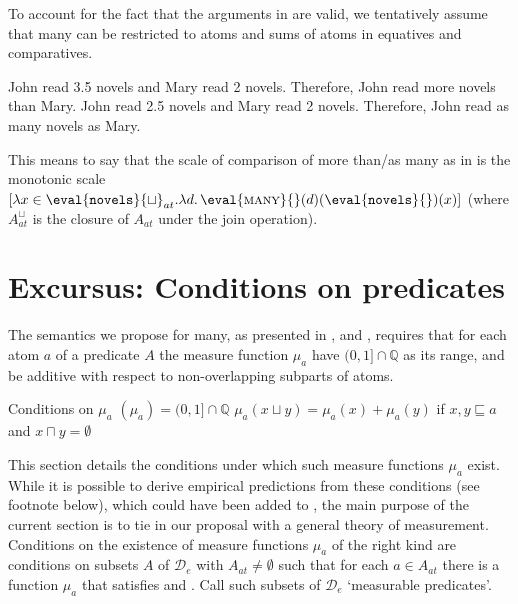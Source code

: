 \documentclass[output=paper]{langscibook}
\begin{document}
\noindent To account for the fact that the arguments in  are valid, we tentatively assume that {\sc many} can be restricted to atoms and sums of atoms in equatives and comparatives.

\ea\label{hai-tri:ValidArgs}
\ea John read 3.5 novels and Mary read 2 novels. Therefore, John read more novels than Mary.
\ex John read 2.5 novels and Mary read 2 novels. Therefore, John read as many novels as Mary.
\z
\z

\noindent This means to say that the scale of comparison of {\ttfamily more than}/{\ttfamily as many as} in  is the monotonic scale $[\lambda x\in\eval{\mbox{\ttfamily novels}}{\sqcup}_{at}.\lambda d.\,\eval{\mbox{\sc many}}{}(d)(\eval{\mbox{\ttfamily novels}}{})(x)]$ (where $A_{at}^{\sqcup}$ is the closure of $A_{at}$ under the join operation).

\section{Excursus: Conditions on predicates}

The semantics we propose for {\sc many}, as presented in ,  and , requires that for each atom $a$ of a predicate $A$ the measure function $\mu_a$ have $(0,1]\cap\mathbb{Q}$ as its range, and be additive with respect to non-overlapping subparts of atoms.

\ea Conditions on $\mu_a$
\ea {}$(\mu_a) = (0,1]\cap\mathbb{Q}$ 
\label{hai-tri:range}
\ex $\mu_a(x \sqcup y) = \mu_a(x) + \mu_a(y)$ if $x, y \sqsubseteq a$ and $x \sqcap y = \emptyset$ 
\label{hai-tri:additivity}
\z
\z

\noindent This section details the conditions under which such measure functions $\mu_a$ exist. While it is possible to derive empirical predictions from these conditions (see footnote  below), which could have been added to , the main purpose of the current section is to tie in our proposal with a general theory of measurement. Conditions on the existence of measure functions $\mu_a$ of the right kind are conditions on subsets $A$ of $\mathcal{D}_e$ with $A_{at}\ne\emptyset$ such that for each $a\in A_{at}$ there is a function $\mu_a$ that satisfies  and . Call such subsets of $\mathcal{D}_e$ `measurable predicates'.
\end{document}
